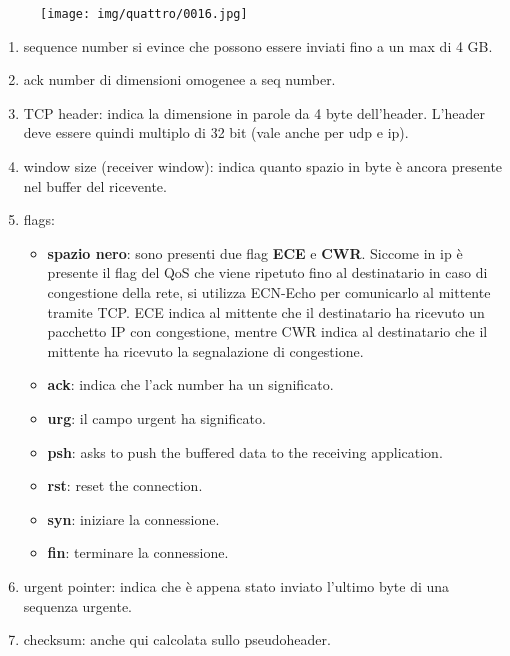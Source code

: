 \documentclass{article}
\begin{document}
 \begin{figure}[!ht]
    \begin{center}
        \texttt{[image: img/quattro/0016.jpg]}         
    \end{center}
\end{figure}

\begin{enumerate}
    \item sequence number si evince che possono essere inviati fino a un max di 4 GB.
    \item ack number di dimensioni omogenee a seq number.
    \item TCP header: indica la dimensione in parole da 4 byte dell'header. L'header deve essere quindi multiplo di 32 bit
    (vale anche per udp e ip).    
    \item window size (receiver window): indica quanto spazio in byte è ancora presente nel buffer del ricevente.
    \item flags: 
        \begin{itemize}
            \item \textbf{spazio nero}: sono presenti due flag \textbf{ECE} e \textbf{CWR}. Siccome in ip è presente il flag del QoS che viene ripetuto
            fino al destinatario in caso di congestione della rete, si utilizza ECN-Echo per comunicarlo al mittente tramite TCP.
            ECE indica al mittente che il destinatario ha ricevuto un pacchetto IP con congestione, mentre CWR indica al destinatario 
            che il mittente ha ricevuto la segnalazione di congestione.
            \item \textbf{ack}: indica che l'ack number ha un significato.
            \item \textbf{urg}: il campo urgent ha significato.
            \item \textbf{psh}: asks to push the buffered data to the receiving application.
            \item \textbf{rst}: reset the connection.
            \item \textbf{syn}: iniziare la connessione.
            \item \textbf{fin}: terminare la connessione.
\end{itemize}

\item urgent pointer: indica che è appena stato inviato l'ultimo byte di una sequenza urgente.
\item checksum: anche qui calcolata sullo pseudoheader.
\end{enumerate}
\end{document}
